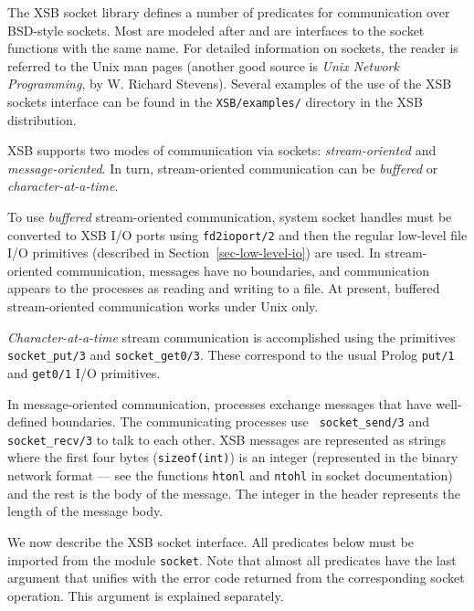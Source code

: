 The XSB socket library defines a number of predicates for communication
over BSD-style sockets. Most are modeled after and are interfaces to the
socket functions with the same name. For detailed information on sockets,
the reader is referred to the Unix man pages (another good source is
\emph{Unix Network Programming}, by W.  Richard Stevens).  Several examples
of the use of the XSB sockets interface can be found in the {\tt XSB/examples/}
directory in the XSB distribution.


XSB supports two modes of communication via sockets: \emph{stream-oriented}
and \emph{message-oriented}. In turn, stream-oriented communication can be
\emph{buffered} or \emph{character-at-a-time}.

To use \emph{buffered} stream-oriented communication, system socket
handles must be converted to XSB I/O ports using {\tt fd2ioport/2} and then
the regular low-level file I/O primitives (described in
Section~\ref{sec-low-level-io}) are used. In stream-oriented communication,
messages have no boundaries, and communication appears to the processes
as reading and writing to a file.  At present, buffered stream-oriented
communication works under Unix only.

\emph{Character-at-a-time} stream communication is accomplished using
the primitives {\tt socket\_put/3} and {\tt socket\_get0/3}. These
correspond to the usual Prolog {\tt put/1} and {\tt get0/1} I/O primitives.

In message-oriented communication, processes exchange messages that have
well-defined boundaries. The communicating processes use {\tt
  socket\_send/3} and {\tt socket\_recv/3} to talk to each other.
XSB messages are represented as strings where the first four bytes
({\tt sizeof(int)}) is an integer (represented in the binary network format
--- see the functions {\tt htonl} and {\tt ntohl} in socket documentation)
and the rest is the body of the message. The integer in the header
represents the length of the message body.

We now describe the XSB socket interface.  All predicates below must be
imported from the module {\tt socket}. Note that almost all predicates have
the last argument that unifies with the error code returned from the
corresponding socket operation. This argument is explained separately.

